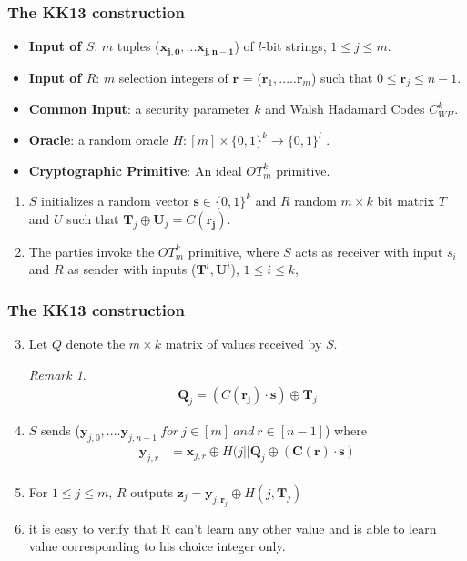 \documentclass[hyperref={pdfpagelabels=false}]{beamer}
\theoremstyle{remark}
\newtheorem*{remark}{Remark}
\begin{document}
\begin{frame}
\frametitle{The KK13 construction}
\begin{itemize}
\item \textbf{Input of $S$}: $m$ tuples ($\mathbf{x_{j,0},... x_{j,n-1}}$) of $l$-bit strings, $1 \leq j \leq m$. \pause
\item \textbf{Input of $R$}: $m$ selection integers of $\mathbf{r}$ = ($\mathbf{r}_1,.....\mathbf{r}_m$) such that $0 \leq \mathbf{r}_j \leq n-1$. \pause
\item \textbf{Common Input}: a security parameter $k$ and Walsh Hadamard Codes $C_{WH}^k$.\pause
\item \textbf{Oracle}: a random oracle $H : \left[m\right] \times \{0,1\}^k \rightarrow \{0,1\}^l$ . \pause
\item \textbf{Cryptographic Primitive}: An ideal $OT_m^k$ primitive.\pause
\end{itemize}
\begin{enumerate}
\item $S$ initializes a random vector $\mathbf{s} \in \{0,1\}^k$ and $R$ random $m \times k$ bit matrix $T$ and $U$ such that $\mathbf{T}_j \oplus \mathbf{U}_j = C(\mathbf{r_j})$. \pause
\item The parties invoke the $OT_m^k$ primitive, where $S$ acts as receiver with input $s_i$ and $R$ as sender with inputs ($\mathbf{T}^i, \mathbf{U}^i$), $1 \leq i \leq k$,
\end{enumerate}
\end{frame}

\begin{frame}
\frametitle{The KK13 construction}
\begin{enumerate}
\setcounter{enumi}{2}
\item Let $Q$ denote the $m \times k$ matrix of values received by $S$. \pause

\begin{remark}
\begin{align*}
\mathbf{Q}_j = (C(\mathbf{r_j}) \cdot \mathbf{s}) \oplus \mathbf{T}_j
\end{align*}
\end{remark}\pause

\item $S$ sends ($\mathbf{y}_{j,0},.... \mathbf{y}_{j,n-1} \ for \ j \in [m] \ and \ r \in [n-1] $) where \pause
\begin{align*}
\mathbf{y}_{j,r} &= \mathbf{x}_{j,r} \oplus H(j|| \mathbf{Q}_j \oplus (\mathbf{C(r)} \cdot \mathbf{s}) \\
\end{align*}
\item For $1 \leq j \leq m$, $R$ outputs $\mathbf{z}_{j} = \mathbf{y}_{j,\mathbf{r}_j} \oplus H(j, \mathbf{T}_{j})$\pause
\item it is easy to verify that R can't learn any other value and is able to learn value corresponding to his choice integer only.
\end{enumerate}
\end{frame}
\end{document}
